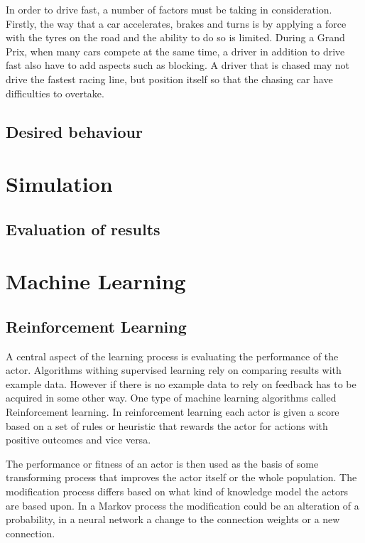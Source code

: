 In order to drive fast, a number of factors must be taking in consideration. Firstly, the way that a car accelerates, brakes and turns is by applying a force with the tyres on the road and the ability to do so is limited\cite{beckman_traction_budget}. During a Grand Prix, when many cars compete at the same time, a driver in addition to drive fast also have to add aspects such as blocking. A driver that is chased may not drive the fastest racing line, but position itself so that the chasing car have difficulties to overtake.

\subsection{Desired behaviour}


\section{Simulation}

\subsection{Evaluation of results}
    
\section{Machine Learning}

\subsection{Reinforcement Learning}
A central aspect of the learning process is evaluating the performance of the actor. Algorithms withing supervised learning rely on comparing results with example data. However if there is no example data to rely on feedback has to be acquired in some other way. One type of machine learning algorithms called Reinforcement learning. In reinforcement learning each actor is given a score based on a set of rules or heuristic that rewards the actor for actions with positive outcomes and vice versa.

The performance or fitness of an actor is then used as the basis of some transforming process that improves the actor itself or the whole population. The modification process differs based on what kind of knowledge model the actors are based upon. In a Markov process the modification could be an alteration of a probability, in a neural network a change to the connection weights or a new connection.  


